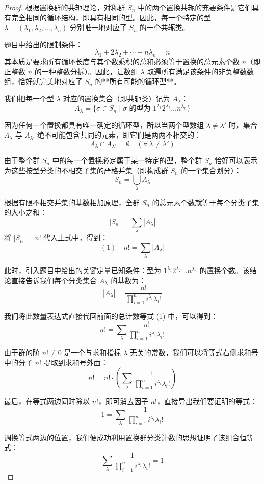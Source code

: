 \documentclass[]{article}
\begin{document}
\begin{proof}
根据置换群的共轭理论，对称群 $S_n$ 中的两个置换共轭的充要条件是它们具有完全相同的循环结构，即具有相同的型。因此，每一个特定的型 $\lambda = (\lambda_1, \lambda_2, \dots, \lambda_n)$ 分别唯一地对应了 $S_n$ 的一个共轭类。

题目中给出的限制条件：
\[ \lambda_{1} + 2\lambda_{2} + \cdots + n\lambda_{n} = n \]
其本质是要求所有循环长度与其个数乘积的总和必须等于置换的总元素个数 $n$（即正整数 $n$ 的一种整数分拆）。因此，让数组 $\lambda$ 取遍所有满足该条件的非负整数数组，恰好就完美地对应了 $S_n$ 的**所有可能的循环型**。

我们把每一个型 $\lambda$ 对应的置换集合（即共轭类）记为 $A_{\lambda}$：
\[ A_{\lambda} = \{ \sigma \in S_n \mid \sigma \text{ 的型为 } 1^{\lambda_1}2^{\lambda_2}\dots n^{\lambda_n} \} \]

因为任何一个置换都具有唯一确定的循环型，所以当两个型数组 $\lambda \neq \lambda'$ 时，集合 $A_{\lambda}$ 与 $A_{\lambda'}$ 绝不可能包含共同的元素，即它们是两两不相交的：
\[ A_{\lambda} \cap A_{\lambda'} = \emptyset \quad (\forall \, \lambda \neq \lambda') \]

由于整个群 $S_n$ 中的每一个置换必定属于某一特定的型，整个群 $S_n$ 恰好可以表示为这些按型分类的不相交子集的严格并集（即构成群 $S_n$ 的一个集合划分）：
\[ S_n = \bigcup_{\lambda} A_{\lambda} \]

根据有限不相交并集的基数相加原理，全群 $S_n$ 的总元素个数就等于每个分类子集的大小之和：
\[ |S_n| = \sum_{\lambda} |A_{\lambda}| \]
将 $|S_n| = n!$ 代入上式中，得到：
\[ (1) \quad n! = \sum_{\lambda} |A_{\lambda}| \]

此时，引入题目中给出的关键定量已知条件：型为 $1^{\lambda_1}2^{\lambda_2}\dots n^{\lambda_n}$ 的置换个数。该结论直接告诉我们每个分类集合 $A_{\lambda}$ 的基数为：
\[ |A_{\lambda}| = \frac{n!}{\prod_{i = 1}^{n}i^{\lambda_i}\lambda_i!} \]

我们将此数量表达式直接代回前面的总计数等式 (1) 中，可以得到：
\[ n! = \sum_{\lambda} \frac{n!}{\prod_{i = 1}^{n}i^{\lambda_i}\lambda_i!} \]

由于群的阶 $n! \neq 0$ 是一个与求和指标 $\lambda$ 无关的常数，我们可以将等式右侧求和号中的分子 $n!$ 提取到求和号外面：
\[ n! = n! \cdot \left( \sum_{\lambda} \frac{1}{\prod_{i = 1}^{n}i^{\lambda_i}\lambda_i!} \right) \]

最后，在等式两边同时除以 $n!$，即可消去因子 $n!$，直接导出我们要证明的等式：
\[ 1 = \sum_{\lambda} \frac{1}{\prod_{i = 1}^{n}i^{\lambda_i}\lambda_i!} \]

调换等式两边的位置，我们便成功利用置换群分类计数的思想证明了该组合恒等式：
\[ \sum_{\lambda} \frac{1}{\prod_{i = 1}^{n}i^{\lambda_i}\lambda_i!} = 1 \]


\end{proof}
\end{document}
